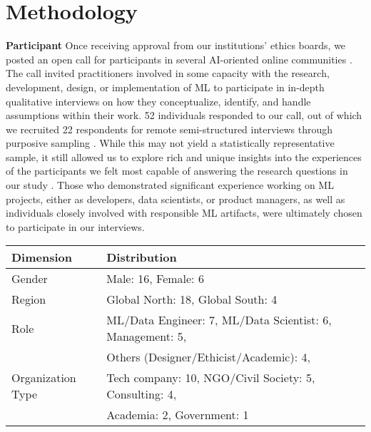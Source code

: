 \section{Methodology}

\smallskip
\noindent \textbf{Participant } Once receiving approval from our institutions' ethics boards, we posted an open call for participants in several AI-oriented online communities . The call invited practitioners involved in some capacity with the research, development, design, or implementation of ML to participate in in-depth qualitative interviews on how they conceptualize, identify, and handle assumptions within their work. 52 individuals responded to our call, out of which we recruited 22 respondents for remote semi-structured interviews through purposive sampling \cite{sharma2017pros}. While this may not yield a statistically representative sample, it still allowed us to explore rich and unique insights into the experiences of the participants we felt most capable of answering the research questions in our study \cite{sharma2017pros,roy2015sampling}. Those who demonstrated significant experience working on ML projects, either as developers, data scientists, or product managers, as well as individuals closely involved with responsible ML artifacts, were ultimately chosen to participate in our interviews.

\begin{table*}[]
\centering
\begin{tabular}{|l|l|}
\hline
\textbf{Dimension} & \textbf{Distribution} \\ \hline
Gender & Male: 16, Female: 6 \\ \hline
Region & Global North: 18, Global South: 4 \\ \hline
Role & ML/Data Engineer: 7, ML/Data Scientist: 6,  Management: 5, \\ 
 & Others (Designer/Ethicist/Academic): 4, \\ \hline
Organization Type & Tech company: 10, NGO/Civil Society: 5, Consulting: 4, \\
& Academia: 2, Government: 1 \\ \hline
\end{tabular}
\caption{}
\label{tab:demographics}
\end{table*}

